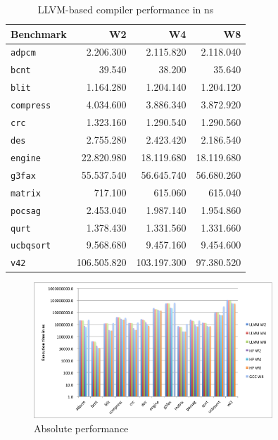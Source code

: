 \begin{table}
  \centering
    \begin{tabular}{|l|r|r|r|}
    \hline
    \textbf{Benchmark} & \multicolumn{1}{|r|}{\textbf{W2}} & \multicolumn{1}{|r|}{\textbf{W4}}  & \multicolumn{1}{|r|}{\textbf{W8}} \\ \hline
	\texttt{adpcm} 		&  2.206.300	&  2.115.820 	&  2.118.040 	\\ \hline
	\texttt{bcnt} 		&  39.540		&  38.200 		&  35.640 		\\ \hline
	\texttt{blit} 		&  1.164.280	&  1.204.140 	&  1.204.120 	\\ \hline
	\texttt{compress} 	&  4.034.600	&  3.886.340 	&  3.872.920 	\\ \hline
	\texttt{crc} 		&  1.323.160	&  1.290.540 	&  1.290.560 	\\ \hline
	\texttt{des} 		&  2.755.280	&  2.423.420 	&  2.186.540 	\\ \hline
	\texttt{engine} 	&  22.820.980	&  18.119.680 	&  18.119.680 	\\ \hline
	\texttt{g3fax} 		&  55.537.540	&  56.645.740 	&  56.680.260 	\\ \hline
	\texttt{matrix} 	&  717.100		&  615.060 		&  615.040 		\\ \hline
	\texttt{pocsag} 	&  2.453.040	&  1.987.140 	&  1.954.860 	\\ \hline
	\texttt{qurt}	 	&  1.378.430	&  1.331.560 	&  1.331.660 	\\ \hline	
	\texttt{ucbqsort} 	&  9.568.680	&  9.457.160 	&  9.454.600 	\\ \hline
	\texttt{v42}	 	&  106.505.820	&  103.197.300 	&  97.380.520 	\\ \hline
    \end{tabular}
  \caption{LLVM-based compiler performance in ns}
  \label{tbl:LLVM_perf}
\end{table}

\begin{figure}[ht]
\centering
\includegraphics[width=0.8\textwidth]{5_results/img/abs_perf.png}
\caption{Absolute performance}
\label{fig:abs_perf}
\end{figure}

